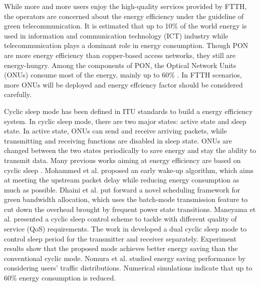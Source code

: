 \documentclass[journal]{IEEEtran}
\begin{document}
While more and more users enjoy the high-quality services provided by FTTH, the operators are concerned about the energy efficiency under the guideline of green telecommunication. It is estimated that up to 10\% of the world energy is used in information and communication technology (ICT) industry while telecommunication plays a dominant role in energy consumption. Though PON are more energy efficiency than copper-based access networks, they still are energy-hungry. Among the components of PON, the Optical Network Units (ONUs) consume most of the energy, mainly up to 60\% \cite{kani2013power}. In FTTH scenarios, more ONUs will be deployed and energy effciency factor should be considered carefully.

Cyclic sleep mode has been defined in ITU standards to build a energy efficiency system. In cyclic sleep mode, there are two major states: active state and sleep state. In active state, ONUs can send and receive arriving packets, while transmitting and receiving functions are disabled in sleep state. ONUs are changed between the two states periodically to save energy and stay the ability to transmit data. Many previous works aiming at energy efficiency are based on cyclic sleep \cite{6172273, 5706311, 5360736, 6069715}. Mohammed et al. \cite{7489960} proposed an early wake-up algorithm, which aims at meeting the upstream packet delay while reducing energy consumption as much as possible. Dhaini et al. \cite{6512637} put forward a novel scheduling framework for green bandwidth allocation, which uses the batch-mode transmission feature to cut down the overhead brought by frequent power state transitions. Maneyama et al. \cite{6954287} presented a cyclic sleep control scheme to tackle with different quality of service (QoS) requirements. The work in \cite{kim2014dual} developed a dual cyclic sleep mode to control sleep period for the transmitter and receiver separately. Experiment results show that the proposed mode achieves better energy saving than the conventional cyclic mode. Nomura et al. \cite{nomura2012onu} studied energy saving performance by considering users' traffic distributions. Numerical simulations indicate that up to 60\% energy consumption is reduced.
\end{document}
